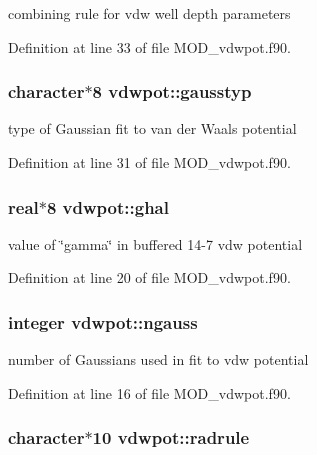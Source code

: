 combining rule for vdw well depth parameters 



Definition at line 33 of file M\-O\-D\-\_\-vdwpot.\-f90.

\hypertarget{classvdwpot_addaae4b84133342d8e313d122abd00f0}{
\subsubsection[{gausstyp}]{\setlength{\rightskip}{0pt plus 5cm}character$\ast$8 vdwpot\-::gausstyp}}\label{classvdwpot_addaae4b84133342d8e313d122abd00f0}


type of Gaussian fit to van der Waals potential 



Definition at line 31 of file M\-O\-D\-\_\-vdwpot.\-f90.

\hypertarget{classvdwpot_a98afcf4416d7bab06175cf40fc553500}{
\subsubsection[{ghal}]{\setlength{\rightskip}{0pt plus 5cm}real$\ast$8 vdwpot\-::ghal}}\label{classvdwpot_a98afcf4416d7bab06175cf40fc553500}


value of \char`\"{}gamma\char`\"{} in buffered 14-\/7 vdw potential 



Definition at line 20 of file M\-O\-D\-\_\-vdwpot.\-f90.

\hypertarget{classvdwpot_a3681327bb2cd375923afb9a39eab5d94}{
\subsubsection[{ngauss}]{\setlength{\rightskip}{0pt plus 5cm}integer vdwpot\-::ngauss}}\label{classvdwpot_a3681327bb2cd375923afb9a39eab5d94}


number of Gaussians used in fit to vdw potential 



Definition at line 16 of file M\-O\-D\-\_\-vdwpot.\-f90.

\hypertarget{classvdwpot_a9c63ba4f7b83e74e3064442adcaa8890}{
\subsubsection[{radrule}]{\setlength{\rightskip}{0pt plus 5cm}character$\ast$10 vdwpot\-::radrule}}\label{classvdwpot_a9c63ba4f7b83e74e3064442adcaa8890}


